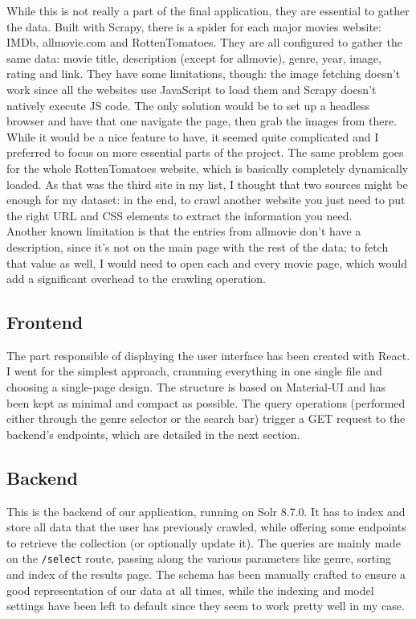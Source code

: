 \documentclass[12pt]{article}
\begin{document}
		While this is not really a part of the final application, they are essential to gather the data. Built with Scrapy, there is a spider for each major movies website: IMDb, allmovie.com and RottenTomatoes. They are all configured to gather the same data: movie title, description (except for allmovie), genre, year, image, rating and link. They have some limitations, though: the image fetching doesn't work since all the websites use JavaScript to load them and Scrapy doesn't natively execute JS code. The only solution would be to set up a headless browser and have that one navigate the page, then grab the images from there. While it would be a nice feature to have, it seemed quite complicated and I preferred to focus on more essential parts of the project. The same problem goes for the whole RottenTomatoes website, which is basically completely dynamically loaded. As that was the third site in my list, I thought that two sources might be enough for my dataset: in the end, to crawl another website you just need to put the right URL and CSS elements to extract the information you need.\\
		Another known limitation is that the entries from allmovie don't have a description, since it's not on the main page with the rest of the data; to fetch that value as well, I would need to open each and every movie page, which would add a significant overhead to the crawling operation.		
	
	\subsection{Frontend}
	
		The part responsible of displaying the user interface has been created with React. I went for the simplest approach, cramming everything in one single file and choosing a single-page design. The structure is based on Material-UI and has been kept as minimal and compact as possible. The query operations (performed either through the genre selector or the search bar) trigger a GET request to the backend's endpoints, which are detailed in the next section.	
	
	\subsection{Backend}
	
		This is the backend of our application, running on Solr 8.7.0. It has to index and store all data that the user has previously crawled, while offering some endpoints to retrieve the collection (or optionally update it). The queries are mainly made on the \texttt{/select} route, passing along the various parameters like genre, sorting and index of the results page. The schema has been manually crafted to ensure a good representation of our data at all times, while the indexing and model settings have been left to default since they seem to work pretty well in my case.
		
\end{document}
